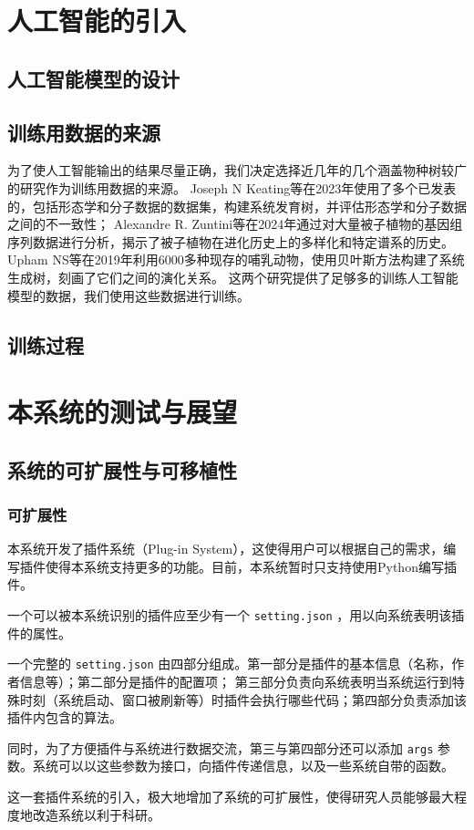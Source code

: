 \documentclass{article}
\begin{document}
\begin{multicols}{2}
\section{人工智能的引入}

\subsection{人工智能模型的设计}

\subsection{训练用数据的来源}
\par
为了使人工智能输出的结果尽量正确，我们决定选择近几年的几个涵盖物种树较广的研究作为训练用数据的来源。
Joseph N Keating等在2023年使用了多个已发表的，包括形态学和分子数据的数据集，构建系统发育树，并评估形态学和分子数据之间的不一致性\cite{ref6}；
Alexandre R. Zuntini等在2024年通过对大量被子植物的基因组序列数据进行分析，揭示了被子植物在进化历史上的多样化和特定谱系的历史\cite{ref7}。
Upham NS等在2019年利用6000多种现存的哺乳动物，使用贝叶斯方法构建了系统生成树，刻画了它们之间的演化关系\cite{ref8}。
这两个研究提供了足够多的训练人工智能模型的数据，我们使用这些数据进行训练。

\subsection{训练过程}


\section{本系统的测试与展望}

\subsection{系统的可扩展性与可移植性}

\subsubsection{可扩展性}
\par
本系统开发了插件系统（Plug-in System），这使得用户可以根据自己的需求，编写插件使得本系统支持更多的功能。目前，本系统暂时只支持使用Python编写插件。
\par
一个可以被本系统识别的插件应至少有一个 \verb|setting.json| ，用以向系统表明该插件的属性。
\par
一个完整的 \verb|setting.json| 由四部分组成。第一部分是插件的基本信息（名称，作者信息等）；第二部分是插件的配置项；
第三部分负责向系统表明当系统运行到特殊时刻（系统启动、窗口被刷新等）时插件会执行哪些代码；第四部分负责添加该插件内包含的算法。
\par
同时，为了方便插件与系统进行数据交流，第三与第四部分还可以添加 \verb|args| 参数。系统可以以这些参数为接口，向插件传递信息，以及一些系统自带的函数。
\par
这一套插件系统的引入，极大地增加了系统的可扩展性，使得研究人员能够最大程度地改造系统以利于科研。


\end{multicols}
\end{document}

